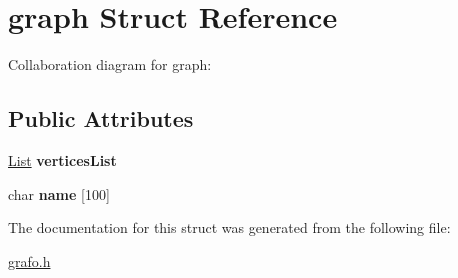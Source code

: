 \hypertarget{structgraph}{}\section{graph Struct Reference}
\label{structgraph}


Collaboration diagram for graph\+:
\subsection*{Public Attributes}
\begin{DoxyCompactItemize}
\item 
\mbox{\label{structgraph_a0ead4ec9235a10bc2f6cd453e508eac6}} 
\hyperlink{lista_8h_a698ff83165b8296011a50bb9aba83964}{List} {\bfseries vertices\+List}
\item 
\mbox{\label{structgraph_a1889833150d9fb8ca2618ad45b6bda43}} 
char {\bfseries name} \mbox{[}100\mbox{]}
\end{DoxyCompactItemize}


The documentation for this struct was generated from the following file\+:\begin{DoxyCompactItemize}
\item 
\hyperlink{grafo_8h}{grafo.\+h}\end{DoxyCompactItemize}
